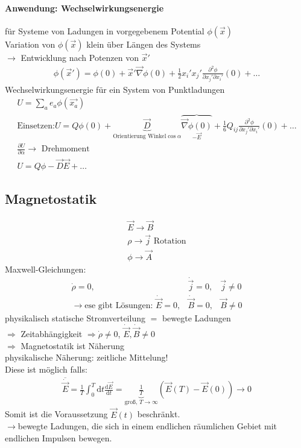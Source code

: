 \documentclass[a4paper]{article}
\begin{document}
\paragraph{Anwendung: Wechselwirkungsenergie}
für Systeme von Ladungen in vorgegebenem Potential $\phi(\vec{x})$\\
Variation von $\phi(\vec{x})$ klein über Längen des Systems\\
$\rightarrow$ Entwicklung nach Potenzen von $\vec{x}'$\\
\begin{align}
\phi(\vec{x}')=\phi(0)+\vec{x}'\vec{\nabla}\phi(0)+\frac{1}{2}x_i'x_j'
\frac{\partial^2\phi}{\partial x_j'\partial x_i'}(0)+\ldots
\end{align}
Wechselwirkungsenergie für ein System von Punktladungen
\begin{align}
U=\sum_a e_a\phi(\vec{x_a})\\
\text{Einsetzen:}
U=Q\phi(0)+\underbrace{\vec{D}}_{\text{Orientierung Winkel}\cos\alpha}
\overbrace{\vec{\nabla}\phi(0)}_{-\vec{E}}+ \frac{1}{6}Q_{ij}\frac{\partial^2\phi}{\partial x_j'\partial x_i'}(0)+\ldots\\
\frac{\partial U}{\partial\alpha}\rightarrow \text{ Drehmoment}\\
U=Q\phi-\vec{D}\vec{E}+\ldots
\end{align}
\subsection{Magnetostatik}
\begin{align}
\vec{E}\rightarrow\vec{B}\\
\rho\rightarrow\vec{j} \text{    Rotation}\\
\phi\rightarrow\vec{A}
\end{align}
Maxwell-Gleichungen:
\begin{align}
\dot{\rho}=0, & \dot{\vec{j}}=0, & \vec{j}\neq0\\
\rightarrow \text{ese gibt Lösungen: } \dot{\vec{E}}=0, &\dot{\vec{B}}=0,
&\vec{B}\neq0
\end{align}
physikalisch statische Stromverteilung $=$ bewegte Ladungen\\
$\Rightarrow$ Zeitabhängigkeit $\Rightarrow \dot{\rho}\neq0$, 
$\dot{\vec{E}},\dot{\vec{B}}\neq0$\\
$\Rightarrow$ Magnetostatik ist Näherung\\
physikalische Näherung: zeitliche Mittelung!\\
Diese ist möglich falls:
\begin{align}
\overline{\dot{\vec{E}}}=\frac{1}{T}\int_0^T \mathrm{d}t
\frac{\mathrm{d}\vec{E}}{\mathrm{d}t}=\underbrace{\frac{1}{T}}_{\text{groß, }T\rightarrow\infty}
\left( \vec{E}(T)-\vec{E}(0) \right)\rightarrow0
\end{align}
Somit ist die Voraussetzung $\vec{E}(t)$ beschränkt.\\
$\rightarrow$bewegte Ladungen, die sich in einem endlichen räumlichen Gebiet mit
endlichen Impulsen bewegen.
\end{document}
